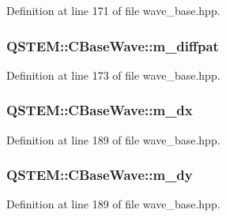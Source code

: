 Definition at line 171 of file wave\-\_\-base.\-hpp.

\hypertarget{class_q_s_t_e_m_1_1_c_base_wave_af6ef0870685f4e8468db7d8f1e62cb8d}{
\subsubsection[{m\-\_\-diffpat}]{ Q\-S\-T\-E\-M\-::\-C\-Base\-Wave\-::m\-\_\-diffpat\hspace{0.3cm}{\ttfamily [protected]}}}\label{class_q_s_t_e_m_1_1_c_base_wave_af6ef0870685f4e8468db7d8f1e62cb8d}


Definition at line 173 of file wave\-\_\-base.\-hpp.

\hypertarget{class_q_s_t_e_m_1_1_c_base_wave_aa28c05f062f847e244e3b40684730058}{
\subsubsection[{m\-\_\-dx}]{ Q\-S\-T\-E\-M\-::\-C\-Base\-Wave\-::m\-\_\-dx\hspace{0.3cm}{\ttfamily [protected]}}}\label{class_q_s_t_e_m_1_1_c_base_wave_aa28c05f062f847e244e3b40684730058}


Definition at line 189 of file wave\-\_\-base.\-hpp.

\hypertarget{class_q_s_t_e_m_1_1_c_base_wave_a0734b5e11e22a2bed6f9110d44323f2e}{
\subsubsection[{m\-\_\-dy}]{ Q\-S\-T\-E\-M\-::\-C\-Base\-Wave\-::m\-\_\-dy\hspace{0.3cm}{\ttfamily [protected]}}}\label{class_q_s_t_e_m_1_1_c_base_wave_a0734b5e11e22a2bed6f9110d44323f2e}


Definition at line 189 of file wave\-\_\-base.\-hpp.

